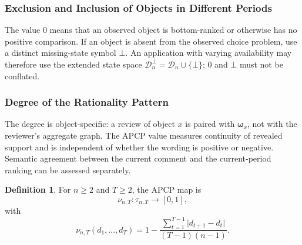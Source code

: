 \documentclass[conference]{IEEEtran}
\theoremstyle{plain}
\theoremstyle{definition}
\newtheorem{definition}{Definition}
\theoremstyle{remark}
\begin{document}
	\subsubsection{Exclusion and Inclusion of Objects in Different Periods}
	The value $0$ means that an observed object is bottom-ranked or otherwise has no positive comparison. If an object is absent from the observed choice problem, use a distinct missing-state symbol $\bot$. An application with varying availability may therefore use the extended state space $\mathcal D_n^{\bot}=\mathcal D_n\cup\{\bot\}$; $0$ and $\bot$ must not be conflated.
	\subsubsection{Degree of the Rationality Pattern} 
	The degree is object-specific: a review of object $x$ is paired with $\boldsymbol\omega_x$, not with the reviewer’s aggregate graph. The APCP value measures continuity of revealed support and is independent of whether the wording is positive or negative. Semantic agreement between the current comment and the current-period ranking can be assessed separately.
	\begin{definition}
		For $n\geq2$ and $T\geq2$, the APCP map is
		\begin{equation}
			\nu_{n,T}:\tau_{n,T}\longrightarrow[0,1],
		\end{equation}
		with
		\begin{equation}\label{eq:apcp-general}
			\nu_{n,T}(d_1,\ldots,d_T)
			=1-\frac{\sum_{t=1}^{T-1}\lvert d_{t+1}-d_t\rvert}
			{(T-1)(n-1)}.
		\end{equation}
	\end{definition}
\end{document}
